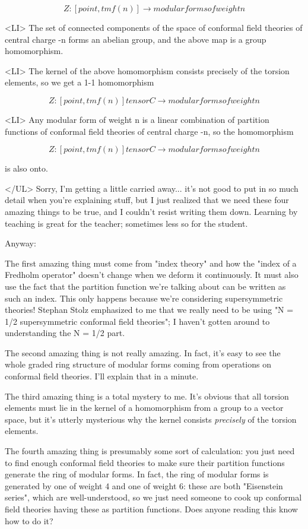 $$

Z: [point,tmf(n)] \to  {modular forms of weight n}
$$
    

<LI> The set of connected components of the space of conformal
field theories of central charge -n forms an abelian group, 
and the above map is a group homomorphism.

<LI> The kernel of the above homomorphism consists precisely of
the torsion elements, so we get a 1-1 homomorphism
 

$$

Z: [point,tmf(n)] tensor C \to  {modular forms of weight n}
$$
    
<LI> Any modular form of weight n is a linear combination of
partition functions of conformal field theories of central
charge -n, so the homomorphism


$$

Z: [point,tmf(n)] tensor C \to  {modular forms of weight n}
$$
    
is also onto.

</UL>
Sorry, I'm getting a little carried away... it's not good to 
put in so much detail when you're explaining stuff, but I 
just realized that we need these four amazing things to be true, 
and I couldn't resist writing them down.  Learning by teaching
is great for the teacher; sometimes less so for the student.  

Anyway: 

The first amazing thing must come from "index theory" and how the
"index of a Fredholm operator" doesn't change when we deform 
it continuously.  It must also use the fact that the partition
function we're talking about can be written as such an index.  This 
only happens because we're considering supersymmetric theories!
Stephan Stolz emphasized to me that we really need to be using 
"N = 1/2 supersymmetric conformal field theories"; I haven't
gotten around to understanding the N = 1/2 part.

The second amazing thing is not really amazing.  In fact, it's
easy to see the whole graded ring structure of modular forms
coming from operations on conformal field theories.  I'll explain
that in a minute.

The third amazing thing is a total mystery to me.  It's
obvious that all torsion elements must lie in the kernel of a
homomorphism from a group to a vector space, but it's utterly
mysterious why the kernel consists \emph{precisely} of the torsion
elements.

The fourth amazing thing is presumably some sort of calculation:
you just need to find enough conformal field theories to make
sure their partition functions generate the ring of modular
forms.  In fact, the ring of modular forms is generated by one
of weight 4 and one of weight 6: these are both "Eisenstein 
series", which are well-understood, so we just need someone to 
cook up conformal field theories having these as partition 
functions.  Does anyone reading this know how to do it?

